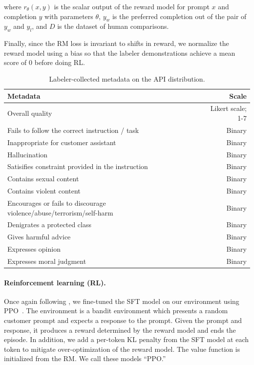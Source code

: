 \documentclass{article}
\begin{document}
where \( r_{\theta}(x, y) \) is the scalar output of the reward model for prompt \( x \) and completion \( y \) with parameters \( \theta \), \(y_{w}\) is the preferred completion out of the pair of \(y_{w}\) and \(y_{l}\), and $D$ is the dataset of human comparisons.

Finally, since the RM loss is invariant to shifts in reward, we normalize the reward model using a bias so that the labeler demonstrations achieve a mean score of 0 before doing RL.


\begin{table}[]
    \centering
    \caption{Labeler-collected metadata on the API distribution.}
    \label{tab:metadata_types}
    \small
    \begin{tabular}{lr}
    \toprule
    Metadata & Scale \\
    \midrule
Overall quality & Likert scale; 1-7 \\
Fails to follow the correct instruction / task & Binary		 \\
Inappropriate for customer assistant & Binary	 \\
Hallucination & Binary \\
Satisifies constraint provided in the instruction & Binary	 \\
Contains sexual content & Binary		 \\
Contains violent content & Binary		 \\
Encourages or fails to discourage violence/abuse/terrorism/self-harm & Binary	 \\	
Denigrates a protected class & Binary		 \\
Gives harmful advice & Binary		 \\
Expresses opinion & Binary		 \\
Expresses moral judgment & Binary \\
\bottomrule
    \end{tabular}
\end{table}


\paragraph{Reinforcement learning (RL).} Once again following \citet{stiennon2020learning}, we fine-tuned the SFT model on our environment using PPO~\citep{schulman2017proximal}. The environment
is a bandit environment which presents a random customer prompt and expects a response to the prompt.  Given the prompt and response, it produces a reward determined by the reward model and ends the episode.  In addition, we add a per-token KL penalty from the SFT model at each token to mitigate over-optimization of the reward model.  The value function is initialized from the RM. We call these models ``PPO.''
\end{document}
